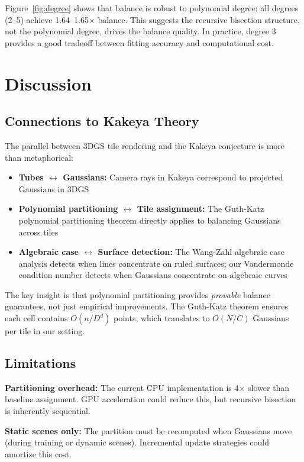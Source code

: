 \documentclass[10pt,twocolumn]{article}
\begin{document}
Figure~\ref{fig:degree} shows that balance is robust to polynomial degree: all degrees (2--5) achieve 1.64--1.65$\times$ balance. This suggests the recursive bisection structure, not the polynomial degree, drives the balance quality. In practice, degree 3 provides a good tradeoff between fitting accuracy and computational cost.

\section{Discussion}

\subsection{Connections to Kakeya Theory}

The parallel between 3DGS tile rendering and the Kakeya conjecture is more than metaphorical:
\begin{itemize}
    \item \textbf{Tubes $\leftrightarrow$ Gaussians:} Camera rays in Kakeya correspond to projected Gaussians in 3DGS
    \item \textbf{Polynomial partitioning $\leftrightarrow$ Tile assignment:} The Guth-Katz polynomial partitioning theorem directly applies to balancing Gaussians across tiles
    \item \textbf{Algebraic case $\leftrightarrow$ Surface detection:} The Wang-Zahl algebraic case analysis detects when lines concentrate on ruled surfaces; our Vandermonde condition number detects when Gaussians concentrate on algebraic curves
\end{itemize}

The key insight is that polynomial partitioning provides \emph{provable} balance guarantees, not just empirical improvements. The Guth-Katz theorem ensures each cell contains $O(n/D^d)$ points, which translates to $O(N/C)$ Gaussians per tile in our setting.

\subsection{Limitations}

\textbf{Partitioning overhead:} The current CPU implementation is 4$\times$ slower than baseline assignment. GPU acceleration could reduce this, but recursive bisection is inherently sequential.

\textbf{Static scenes only:} The partition must be recomputed when Gaussians move (during training or dynamic scenes). Incremental update strategies could amortize this cost.
\end{document}
